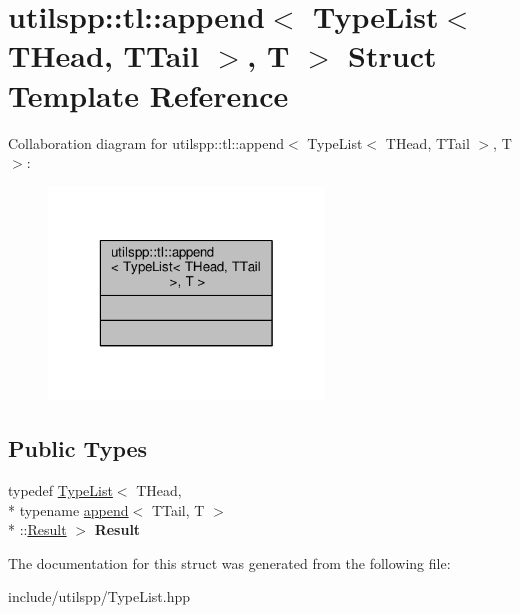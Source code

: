 \hypertarget{structutilspp_1_1tl_1_1append_3_01TypeList_3_01THead_00_01TTail_01_4_00_01T_01_4}{\section{utilspp\-:\-:tl\-:\-:append$<$ Type\-List$<$ T\-Head, T\-Tail $>$, T $>$ Struct Template Reference}
\label{structutilspp_1_1tl_1_1append_3_01TypeList_3_01THead_00_01TTail_01_4_00_01T_01_4}
}


Collaboration diagram for utilspp\-:\-:tl\-:\-:append$<$ Type\-List$<$ T\-Head, T\-Tail $>$, T $>$\-:\nopagebreak
\begin{figure}[H]
\begin{center}
\leavevmode
\includegraphics[width=208pt]{structutilspp_1_1tl_1_1append_3_01TypeList_3_01THead_00_01TTail_01_4_00_01T_01_4__coll__graph}
\end{center}
\end{figure}
\subsection*{Public Types}
\begin{DoxyCompactItemize}
\item 
\hypertarget{structutilspp_1_1tl_1_1append_3_01TypeList_3_01THead_00_01TTail_01_4_00_01T_01_4_af85ba63843e47eebcf0af6feeda0d295}{typedef \hyperlink{structutilspp_1_1tl_1_1TypeList}{Type\-List}$<$ T\-Head, \\*
typename \hyperlink{structutilspp_1_1tl_1_1append}{append}$<$ T\-Tail, T $>$\\*
\-::\hyperlink{structutilspp_1_1tl_1_1TypeList}{Result} $>$ {\bfseries Result}}\label{structutilspp_1_1tl_1_1append_3_01TypeList_3_01THead_00_01TTail_01_4_00_01T_01_4_af85ba63843e47eebcf0af6feeda0d295}

\end{DoxyCompactItemize}


The documentation for this struct was generated from the following file\-:\begin{DoxyCompactItemize}
\item 
include/utilspp/Type\-List.\-hpp\end{DoxyCompactItemize}

